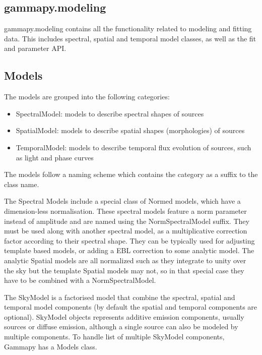 \subsection{gammapy.modeling}
\label{ssec:gammapy-modeling}

gammapy.modeling contains all the functionality related to modeling and fitting
data. This includes spectral, spatial and temporal model classes, as well as
the fit and parameter API.

\subsection{Models}
\label{ssec:models}

The models are grouped into the following categories:

\begin{itemize}
	\item SpectralModel: models to describe spectral shapes of sources
	\item SpatialModel: models to describe spatial shapes (morphologies) of sources
	\item TemporalModel: models to describe temporal flux evolution of sources, such as
	      light and phase curves

\end{itemize}

The models follow a naming scheme which contains the category as a suffix to
the class name.

The  Spectral Models include a special class of Normed models, which have a
dimension-less normalisation. These spectral models feature a norm parameter
instead of amplitude and are named using the NormSpectralModel suffix. They
must be used along with another spectral model, as a multiplicative correction
factor according to their spectral shape. They can be typically used for
adjusting template based models, or adding a EBL correction to some analytic
model. The analytic Spatial models are all normalized such as they integrate to
unity over the sky but the template Spatial models may not, so in that special
case they have to be combined with a NormSpectralModel.

The SkyModel is a factorised model that combine the spectral, spatial and
temporal model components (by default the spatial and temporal components are
optional). SkyModel objects represents additive emission components, usually
sources or diffuse emission, although a single source can also be modeled by
multiple components. To handle list of multiple SkyModel components, Gammapy
has a Models class.


